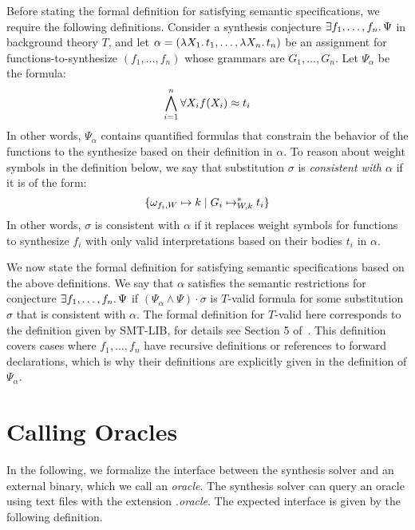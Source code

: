 \documentclass[english,a4paper,10pt]{article}
\begin{document}
Before stating the formal definition for satisfying semantic specifications,
we require the following definitions.
Consider a synthesis conjecture $\exists f_1, \ldots, f_n \ldotp\Psi$
in background theory $T$, and let
$\alpha = ( \lambda X_1 \ldotp t_1, \ldots, \lambda X_n \ldotp t_n)$
be an assignment for functions-to-synthesize $( f_1, \ldots, f_n )$
whose grammars are $G_1, \ldots, G_n$.
Let $\Psi_{\alpha}$ be the formula:
\[
\bigwedge_{i=1}^{n} \forall X_i f( X_i ) \approx t_i
\]
In other words, $\Psi_{\alpha}$ contains quantified formulas
that constrain the behavior of the functions to the synthesize
based on their definition in $\alpha$.
To reason about weight symbols in the definition below,
we say that substitution $\sigma$ is \emph{consistent with $\alpha$} if
it is of the form:
\[
\{ \omega_{f_i,W} \mapsto k \mid G_i \mapsto_{W,k}^{\ast} t_i \}
\]
In other words, $\sigma$ is consistent with $\alpha$ if it replaces
weight symbols for functions to synthesize $f_i$
with only valid interpretations based on their bodies $t_i$ in $\alpha$.

We now state the formal definition for satisfying semantic specifications
based on the above definitions.
We say that $\alpha$
satisfies the semantic restrictions for conjecture
$\exists f_1, \ldots, f_n \ldotp\Psi$
if $(\Psi_{\alpha} \wedge \Psi) \cdot \sigma$ is $T$-valid formula
for some substitution $\sigma$ that is consistent with $\alpha$.
The formal definition for $T$-valid here
corresponds to the definition given by SMT-LIB,
for details see Section 5 of~\cite{BarFT-RR-17}.
This definition covers cases where $f_1, \ldots, f_n$
have recursive definitions or references to forward declarations,
which is why their definitions are explicitly given in the definition of
$\Psi_{\alpha}$.

\section{Calling Oracles}%
\label{sec:oracleimplementations}

In the following, we formalize the interface between the
synthesis solver and an external binary, which we call an \emph{oracle}.
The synthesis solver can query an oracle using text files with the extension
\textit{.oracle}.
The expected interface is given by the following definition.
\end{document}
